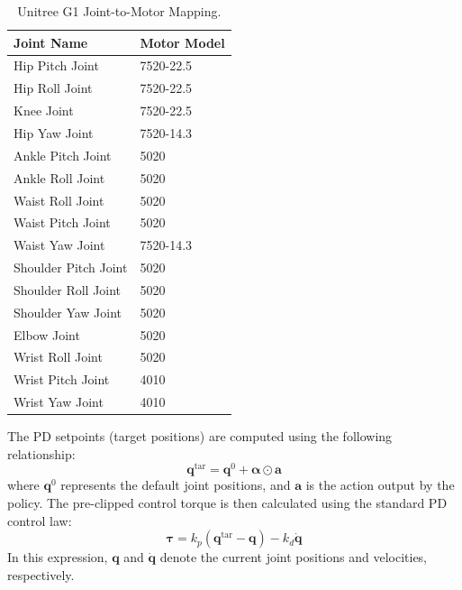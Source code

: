 \begin{table}[t]
    \centering
    \caption{Unitree G1 Joint-to-Motor Mapping.}
    \label{tab:joint_motor_mapping}
    \begin{tabular}{ll}
        \toprule
        \textbf{Joint Name} & \textbf{Motor Model} \\ 
        \midrule
        Hip Pitch Joint & 7520-22.5 \\
        Hip Roll Joint & 7520-22.5 \\
        Knee Joint & 7520-22.5 \\
        Hip Yaw Joint & 7520-14.3 \\
        \midrule
        Ankle Pitch Joint & 5020 \\
        Ankle Roll Joint & 5020 \\
        \midrule
        Waist Roll Joint & 5020 \\
        Waist Pitch Joint & 5020 \\
        Waist Yaw Joint & 7520-14.3 \\
        \midrule
        Shoulder Pitch Joint & 5020 \\
        Shoulder Roll Joint & 5020 \\
        Shoulder Yaw Joint & 5020 \\
        Elbow Joint & 5020 \\
        Wrist Roll Joint & 5020 \\
        Wrist Pitch Joint & 4010 \\
        Wrist Yaw Joint & 4010 \\
        \bottomrule
    \end{tabular}
\end{table}

The PD setpoints (target positions) are computed using the following relationship:$$\boldsymbol{q}^{\text{tar}} = \boldsymbol{q}^{0} + \boldsymbol{\alpha} \odot \mathbf{a}$$where $\boldsymbol{q}^{0}$ represents the default joint positions, and $\mathbf{a}$ is the action output by the policy. The pre-clipped control torque is then calculated using the standard PD control law:$$\boldsymbol{\tau} = k_p (\boldsymbol{q}^{\text{tar}} - \boldsymbol{q}) - k_d \dot{\boldsymbol{q}}$$In this expression, $\mathbf{q}$ and $\dot{\mathbf{q}}$ denote the current joint positions and velocities, respectively.





